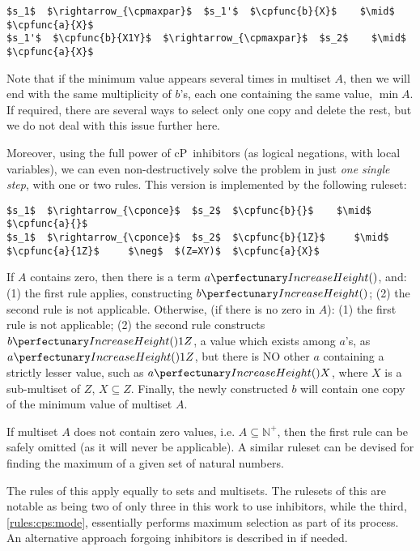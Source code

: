 \lstset{xleftmargin=.5in, xrightmargin=.5in} 
\begin{lstlisting}
$s_1$  $\rightarrow_{\cpmaxpar}$  $s_1'$  $\cpfunc{b}{X}$    $\mid$  $\cpfunc{a}{X}$  
$s_1'$  $\cpfunc{b}{X1Y}$  $\rightarrow_{\cpmaxpar}$  $s_2$    $\mid$  $\cpfunc{a}{X}$  
\end{lstlisting}

Note that if the minimum value appears several times in multiset \(A\), 
then we will end with the same multiplicity of \(b\)'s, each one containing the same value, \(\mathop{min} A\).
If required, there are several ways to select only one copy and delete the rest, but we do not deal with this issue further here.

Moreover, using the full power of cP~inhibitors (as logical negations, with local variables), 
we can even non-destructively solve the problem in just \emph{one single step},
with one or two rules.
This version is implemented by the following ruleset:

\lstset{xleftmargin=.5in, xrightmargin=.5in} 
\begin{lstlisting}
$s_1$  $\rightarrow_{\cponce}$  $s_2$  $\cpfunc{b}{}$    $\mid$  $\cpfunc{a}{}$
$s_1$  $\rightarrow_{\cponce}$  $s_2$  $\cpfunc{b}{1Z}$     $\mid$  $\cpfunc{a}{1Z}$     $\neg$  $(Z=XY)$  $\cpfunc{a}{X}$
\end{lstlisting}

If \(A\) contains zero, then there is a term \(\cpfunc{a}{}\), and: (1) the first rule applies, constructing \(\cpfunc{b}{}\); (2) the second rule is not applicable.
Otherwise, (if there is no zero in \(A\)): (1) the first rule is not applicable; (2) the second rule constructs \(\cpfunc{b}{1Z}\), 
a value which exists among \(a\)'s, as \(\cpfunc{a}{1Z}\), but there is NO other \(a\) containing a strictly lesser value, such as \(\cpfunc{a}{X}\),
where \(X\) is a sub-multiset of \(Z\), \(X \subseteq Z\).
Finally, the newly constructed \(b\) will contain one copy of the minimum value of multiset \(A\).

If multiset \(A\) does not contain zero values, i.e. \(A \subseteq \mathbb{N}^+\), then the first rule can be safely omitted (as it will never be applicable). 
A similar ruleset can be devised for finding the maximum of a given set of natural numbers.

The rules of this  apply equally to sets and multisets.  The rulesets of this   are notable as being two of only three in this work to use inhibitors, while the third, \cref{rules:cps:mode}, essentially performs maximum selection as part of its process.  An alternative approach forgoing inhibitors is described in \cite{Nicolescu2018} if needed.

